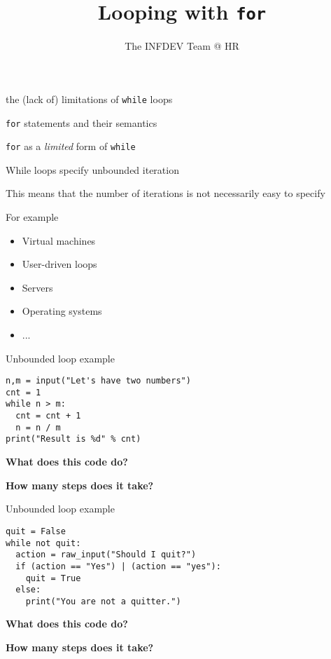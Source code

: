 \documentclass{beamer}
\title{Looping with \texttt{for}}
\author{The INFDEV Team @ HR}
\institute{Hogeschool Rotterdam \\ 
Rotterdam, Netherlands}
\date{}
\begin{document}
\maketitle

\begin{slide}{
\item the (lack of) limitations of \texttt{while} loops
\item \texttt{for} statements and their semantics
\item \texttt{for} as a \textit{limited} form of \texttt{while}
}\end{slide}

\begin{slide}{
\item While loops specify unbounded iteration
\item This means that the number of iterations is not necessarily easy to specify
\item For example
\begin{itemize}
\item Virtual machines
\item User-driven loops
\item Servers
\item Operating systems
\item ...
\end{itemize}
}\end{slide}

\begin{frame}[fragile]{Unbounded loop example}
\begin{lstlisting}
n,m = input("Let's have two numbers")
cnt = 1
while n > m:
  cnt = cnt + 1
  n = n / m
print("Result is %d" % cnt)
\end{lstlisting}

\textbf{What does this code do?}

\textbf{How many steps does it take?}
\end{frame}

\begin{frame}[fragile]{Unbounded loop example}
\begin{lstlisting}
quit = False
while not quit:
  action = raw_input("Should I quit?")
  if (action == "Yes") | (action == "yes"):
    quit = True
  else:
    print("You are not a quitter.")
\end{lstlisting}

\textbf{What does this code do?}

\textbf{How many steps does it take?}
\end{frame}
\end{document}
